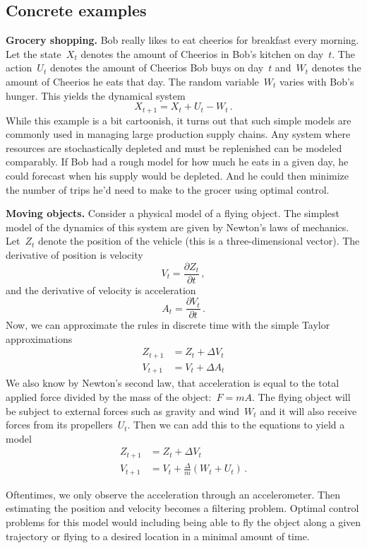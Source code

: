\documentclass{tufte-book}
\begin{document}
\hypertarget{concrete-examples}{%
\subsection{Concrete examples}\label{concrete-examples}}

\textbf{Grocery shopping.} Bob really likes to eat cheerios for
breakfast every morning. Let the state~\(X_t\) denotes the amount of
Cheerios in Bob's kitchen on day~\(t\). The action~\(U_t\) denotes the
amount of Cheerios Bob buys on day~\(t\) and~\(W_t\) denotes the amount
of Cheerios he eats that day. The random variable~\(W_t\) varies with
Bob's hunger. This yields the dynamical system \[
    X_{t+1} = X_t + U_t - W_t\,.
\] While this example is a bit cartoonish, it turns out that such simple
models are commonly used in managing large production supply chains. Any
system where resources are stochastically depleted and must be
replenished can be modeled comparably. If Bob had a rough model for how
much he eats in a given day, he could forecast when his supply would be
depleted. And he could then minimize the number of trips he'd need to
make to the grocer using optimal control.

\textbf{Moving objects.} Consider a physical model of a flying object.
The simplest model of the dynamics of this system are given by Newton's
laws of mechanics. Let~\(Z_t\) denote the position of the vehicle (this
is a three-dimensional vector). The derivative of position is velocity
\[
V_t = \frac{\partial Z_t}{\partial t}\,,
\] and the derivative of velocity is acceleration \[
A_t = \frac{\partial V_t}{\partial t}\,.
\] Now, we can approximate the rules in discrete time with the simple
Taylor approximations \[
\begin{aligned}
    Z_{t+1} &= Z_t + \Delta V_t\\
    V_{t+1} &= V_t + \Delta A_t
\end{aligned}
\] We also know by Newton's second law, that acceleration is equal to
the total applied force divided by the mass of the object:~\(F=mA\). The
flying object will be subject to external forces such as gravity and
wind~\(W_t\) and it will also receive forces from its
propellers~\(U_t\). Then we can add this to the equations to yield a
model \[
\begin{aligned}
    Z_{t+1} &= Z_t + \Delta V_t\\
    V_{t+1} &= V_t + \frac{\Delta}{m} (W_t+U_t)\,.
\end{aligned}
\]

Oftentimes, we only observe the acceleration through an accelerometer.
Then estimating the position and velocity becomes a filtering problem.
Optimal control problems for this model would including being able to
fly the object along a given trajectory or flying to a desired location
in a minimal amount of time.
\end{document}
